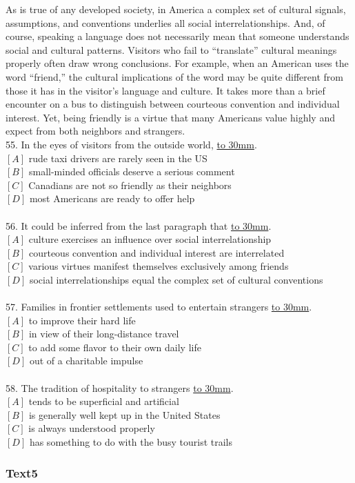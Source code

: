 \documentclass[a4paper]{article}
\begin{document}
\par
As is true of any developed society, in America a complex set of cultural signals, assumptions, and conventions underlies all social interrelationships. And, of course, speaking a language does not necessarily mean that someone understands social and cultural patterns. Visitors who fail to “translate” cultural meanings properly often draw wrong conclusions. For example, when an American uses the word “friend,” the cultural implications of the word may be quite different from those it has in the visitor’s language and culture. It takes more than a brief encounter on a bus to distinguish between courteous convention and individual interest. Yet, being friendly is a virtue that many Americans value highly and expect from both neighbors and strangers.
\\55.	In the eyes of visitors from the outside world, \underline{\hbox to 30mm{}}.\\$[A]$ rude taxi drivers are rarely seen in the US\\$[B]$ small-minded officials deserve a serious comment\\$[C]$ Canadians are not so friendly as their neighbors\\$[D]$ most Americans are ready to offer help\\\\56.	It could be inferred from the last paragraph that \underline{\hbox to 30mm{}}.\\$[A]$ culture exercises an influence over social interrelationship\\$[B]$ courteous convention and individual interest are interrelated\\$[C]$ various virtues manifest themselves exclusively among friends\\$[D]$ social interrelationships equal the complex set of cultural conventions\\\\57.	Families in frontier settlements used to entertain strangers \underline{\hbox to 30mm{}}.\\$[A]$ to improve their hard life\\$[B]$ in view of their long-distance travel\\$[C]$ to add some flavor to their own daily life\\$[D]$ out of a charitable impulse\\\\58.	The tradition of hospitality to strangers \underline{\hbox to 30mm{}}.\\$[A]$ tends to be superficial and artificial\\$[B]$ is generally well kept up in the United States\\$[C]$ is always understood properly\\$[D]$ has something to do with the busy tourist trails\\\subsubsection{Text5}
\end{document}
